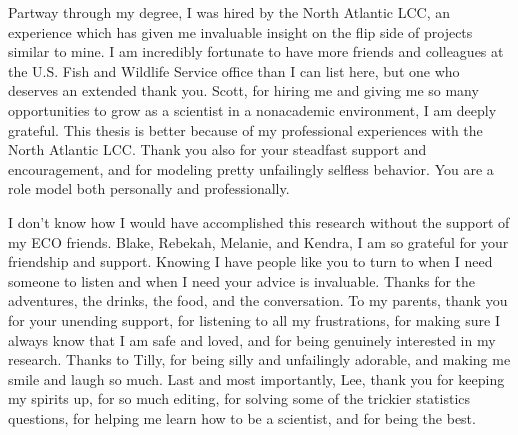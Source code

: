 Partway through my degree, I was hired by the North Atlantic LCC, an experience which has given me invaluable insight on the flip side of projects similar to mine. I am incredibly fortunate to have more friends and colleagues at the U.S. Fish and Wildlife Service office than I can list here, but one who deserves an extended thank you. Scott, for hiring me and giving me so many opportunities to grow as a scientist in a nonacademic environment, I am deeply grateful. This thesis is better because of my professional experiences with the North Atlantic LCC. Thank you also for your steadfast support and encouragement, and for modeling pretty unfailingly selfless behavior. You are a role model both personally and professionally.

I don't know how I would have accomplished this research without the support of my ECO friends. Blake, Rebekah, Melanie, and Kendra, I am so grateful for your friendship and support. Knowing I have people like you to turn to when I need someone to listen and when I need your advice is invaluable. Thanks for the adventures, the drinks, the food, and the conversation. To my parents, thank you for your unending support, for listening to all my frustrations, for making sure I always know that I am safe and loved, and for being genuinely interested in my research. Thanks to Tilly, for being silly and unfailingly adorable, and making me smile and laugh so much. Last and most importantly, Lee, thank you for keeping my spirits up, for so much editing, for solving some of the trickier statistics questions, for helping me learn how to be a scientist, and for being the best. 

